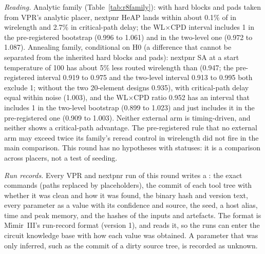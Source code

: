 \emph{Reading.} Analytic family (Table~\ref{tab:r8family}): with hard blocks and pads taken from VPR's analytic placer, nextpnr HeAP
lands within about 0.1\% of  in wirelength and 2.7\% in critical-path delay; the WL$\times$CPD interval includes 1 in the
pre-registered bootstrap (0.996 to 1.061) and in the two-level one (0.972 to 1.087). Annealing family, conditional on H0
(a difference that cannot be separated from the inherited hard blocks and pads): nextpnr SA at a start temperature of 100 has about 5\% less routed wirelength than
 (0.947; the pre-registered interval 0.919 to 0.975 and the two-level interval 0.913 to 0.995 both exclude 1; without the two 20-element designs
0.935), with critical-path delay equal within noise (1.003), and the WL$\times$CPD ratio 0.952 has an interval that includes 1 in the two-level bootstrap (0.899 to 1.023)
and just includes it in the pre-registered one (0.909 to 1.003). Neither external arm is timing-driven, and neither shows a critical-path advantage. The
pre-registered rule that no external arm may exceed twice its family's reread control in wirelength did not fire in the main comparison. This round has
no hypotheses with statuses: it is a comparison across placers, not a test of seeding.

\emph{Run records.} Every VPR and nextpnr run of this round writes a : the exact commands (paths replaced by
placeholders), the commit of each tool tree with whether it was clean and how it was found, the binary hash and version text, every parameter as a
value with its confidence and source, the seed, a host alias, time and peak memory, and the hashes of the inputs and artefacts. The format is
M\'{\i}mir~III's run-record format (version 1), and  reads it, so the runs can enter the circuit knowledge base with
how each value was obtained. A parameter that was only inferred, such as the commit of a dirty source tree, is recorded as unknown.
